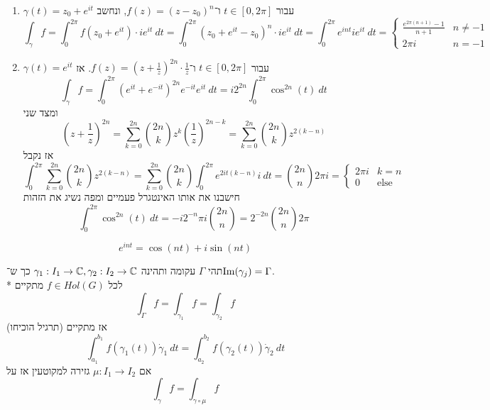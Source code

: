 \begin{example}
	\begin{enumerate}
		\item $\gamma(t) = z_0 + e^{it}$ עבור $t \in [0, 2\pi]$ ו־$f(z) = {(z - z_0)}^n$, ונחשב
			\[
				\int_\gamma f
				= \int_0^{2\pi} f(z_0 + e^{it}) \cdot i e^{it}\ dt
				= \int_0^{2\pi} {(z_0 + e^{it} - z_0)}^n \cdot i e^{it}\ dt
				= \int_0^{2\pi} e^{int} i e^{it}\ dt
				= \begin{cases}
					\frac{e^{2\pi(n + 1)} - 1}{n + 1} & n \ne -1 \\
					2\pi i & n = -1
				\end{cases}
			\]
		\item $\gamma(t) = e^{it}$ עבור $t \in [0, 2\pi]$ ו־$f(z) = {(z + \frac{1}{z})}^{2n} \cdot \frac{1}{z}$. אז
			\[
				\int_\gamma f = \int_0^{2\pi} {(e^{it} + e^{-it})}^{2n} e^{-it} e^{it}\ dt
				= i 2^{2n} \int_0^{2\pi} \cos^{2n}(t)\ dt
			\]
			ומצד שני
			\[
				{(z + \frac{1}{z})}^{2n}
				= \sum_{k = 0}^{2n} \binom{2n}{k} z^k {(\frac{1}{z})}^{2n - k}
				= \sum_{k = 0}^{2n} \binom{2n}{k} z^{2(k - n)}
			\]
			אז נקבל
			\[
				\int_0^{2\pi} \sum_{k = 0}^{2n} \binom{2n}{k} z^{2(k - n)}
				= \sum_{k = 0}^{2n} \binom{2n}{k} \int_0^{2\pi} e^{2it (k - n)} i\ dt
				= \binom{2n}{n} 2\pi i
				= \begin{cases}
					2\pi i & k = n \\
					0 & \text{else}
				\end{cases}
			\]
			חישבנו את אותו האינטגרל פעמיים ומפה נשיג את הזהות
			\[
				\int_0^{2\pi} \cos^{2n}(t)\ dt =-i2^{-n} \pi i \binom{2n}{n} = 2^{-2n} \binom{2n}{n} 2 \pi
			\]
	\end{enumerate}
\end{example}
\begin{exercise}
	\[
		e^{int} = \cos(nt) + i \sin(nt)
	\]
\end{exercise}
\begin{proposition}[ר־פרמטריזציה]
	תהי $\Gamma$ עקומה ותהינה $\gamma_1 : I_1 \to \mathbb{C}, \gamma_2 : I_2 \to \mathbb{C}$ כך ש־$\operatorname{Im}(\gamma_j) = \Gamma$. \\*
	לכל $f \in Hol(G)$ מתקיים
	\[
		\int_\Gamma f = \int_{\gamma_1} f = \int_{\gamma_2} f
	\]
	אז מתקיים (תרגיל הוכיחו)
	\[
		\int_{a_1}^{b_1} f(\gamma_1(t)) \dot{\gamma}_1\ dt = \int_{a_2}^{b_2} f(\gamma_2(t)) \dot{\gamma}_2\ dt
	\]
	אם $\mu : I_1 \to I_2$ גזירה למקוטעין אז על
	\[
		\int_\gamma f = \int_{\gamma \circ \mu} f
	\]
\end{proposition}

